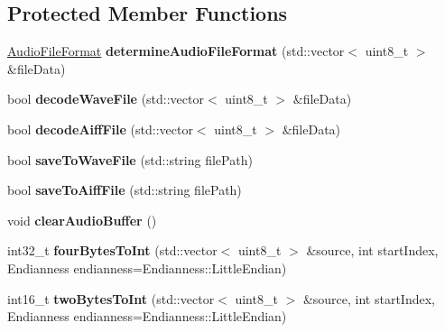 \subsection*{Protected Member Functions}
\begin{DoxyCompactItemize}
\item 
\hypertarget{class_audio_file_a0d55bc7ae7b9eb014b93b6baabab8ba7}{\hyperlink{_audio_file_8h_ad18559d169602e85d0ad68da6ef8593f}{Audio\-File\-Format} {\bfseries determine\-Audio\-File\-Format} (std\-::vector$<$ uint8\-\_\-t $>$ \&file\-Data)}\label{class_audio_file_a0d55bc7ae7b9eb014b93b6baabab8ba7}

\item 
\hypertarget{class_audio_file_afea0b1dbe7788155f249fa3b8a0ad693}{bool {\bfseries decode\-Wave\-File} (std\-::vector$<$ uint8\-\_\-t $>$ \&file\-Data)}\label{class_audio_file_afea0b1dbe7788155f249fa3b8a0ad693}

\item 
\hypertarget{class_audio_file_a1d68d689475374b830c3e41d7cd54dfa}{bool {\bfseries decode\-Aiff\-File} (std\-::vector$<$ uint8\-\_\-t $>$ \&file\-Data)}\label{class_audio_file_a1d68d689475374b830c3e41d7cd54dfa}

\item 
\hypertarget{class_audio_file_a9b1997f2466ec1674ce17bebb9a1ba2d}{bool {\bfseries save\-To\-Wave\-File} (std\-::string file\-Path)}\label{class_audio_file_a9b1997f2466ec1674ce17bebb9a1ba2d}

\item 
\hypertarget{class_audio_file_aa6ed89cc0884105f7022c7595c1609ea}{bool {\bfseries save\-To\-Aiff\-File} (std\-::string file\-Path)}\label{class_audio_file_aa6ed89cc0884105f7022c7595c1609ea}

\item 
\hypertarget{class_audio_file_a4859348770aba2ab8638a6d2d29490ad}{void {\bfseries clear\-Audio\-Buffer} ()}\label{class_audio_file_a4859348770aba2ab8638a6d2d29490ad}

\item 
\hypertarget{class_audio_file_a5fcde4e965721804e6f60fc38936887f}{int32\-\_\-t {\bfseries four\-Bytes\-To\-Int} (std\-::vector$<$ uint8\-\_\-t $>$ \&source, int start\-Index, Endianness endianness=Endianness\-::\-Little\-Endian)}\label{class_audio_file_a5fcde4e965721804e6f60fc38936887f}

\item 
\hypertarget{class_audio_file_a279bb7ae95e4b3b9db5e9c9e141b564d}{int16\-\_\-t {\bfseries two\-Bytes\-To\-Int} (std\-::vector$<$ uint8\-\_\-t $>$ \&source, int start\-Index, Endianness endianness=Endianness\-::\-Little\-Endian)}\label{class_audio_file_a279bb7ae95e4b3b9db5e9c9e141b564d}


\end{DoxyCompactItemize}
